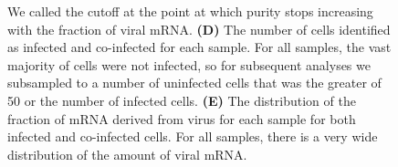 \documentclass[9pt,lineno]{elife}
\begin{document}
\begin{figure}
{We called the cutoff at the point at which purity stops increasing with the fraction of viral mRNA.
{\bf (D)}
The number of cells identified as infected and co-infected for each sample.
For all samples, the vast majority of cells were not infected, so for subsequent analyses we subsampled to a number of uninfected cells that was the greater of 50 or the number of infected cells.
{\bf (E)} 
The distribution of the fraction of mRNA derived from virus for each sample for both infected and co-infected cells.
For all samples, there is a very wide distribution of the amount of viral mRNA.
}
\end{figure}
\end{document}
